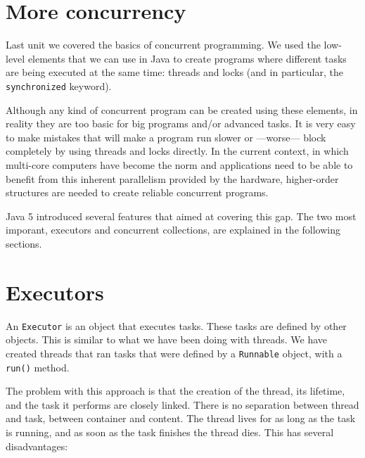 


\section{More concurrency}
\label{sec:more-concurrency}

Last unit we covered the basics of concurrent programming. We used the
low-level elements that we can use in Java to create programs where
different tasks are being executed at the same time: threads and
locks (and in particular, the \verb+synchronized+ keyword). 

Although any kind of concurrent program can be created using these
elements, in reality they are too basic for big programs and/or
advanced tasks. It is very easy to make mistakes that will make a
program run slower or ---worse--- block completely by using threads
and locks directly. In the current context, in which multi-core
computers have become the norm and applications need to be able to
benefit from this inherent parallelism provided by the hardware,
higher-order structures are needed to create reliable concurrent
programs. 

Java 5 introduced several features that aimed at covering this
gap. The two most imporant, executors and concurrent collections, are
explained in the following sections.


\section{Executors}
\label{sec:executors}

An \verb+Executor+ is an object that executes tasks. These tasks are
defined by other objects. 
%
This is similar to what we have been doing with threads. We have
created threads that ran tasks that were defined by a \verb+Runnable+
object, with a \verb+run()+ method. 

The problem with this approach is that the creation of the thread, its
lifetime, and the task it performs are closely linked. There is no
separation between thread and task, between container and
content. The thread lives for as long as the task is running, and as
soon as the task finishes the thread dies. This has several
disadvantages: 

